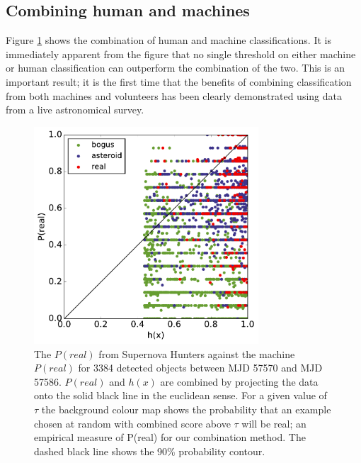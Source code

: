 \documentclass[a4paper,fleqn,usenatbib]{mnras}
\begin{document}
\subsection{Combining human and machines} 

Figure \ref{fig:combo_train} shows the combination of human and machine classifications. It is immediately apparent from the figure that no single threshold on either machine or human classification can outperform the combination of the two. This is an important result; it is the first time that the benefits of combining classification from both machines and volunteers has been clearly demonstrated using data from a live astronomical survey. 

\begin{figure}
   \includegraphics[width=84mm]{figs/human_v_machine_20160712-20160718_1.pdf}
   \caption{The $P(real)$ from Supernova Hunters against the machine $P(real)$ for 3384 detected 
            objects between MJD 57570 and MJD 57586.  $P(real)$ and $h(x)$ are combined by projecting the data onto 
             the solid black line in the euclidean sense.  For a given value of $\tau$ the background colour map
            shows the probability that an example chosen at random with combined score above $\tau$ will be real; an
            empirical measure of P(real) for our combination method.  The dashed black line shows the 90\% probability contour.}
   \label{fig:combo_train} 
\end{figure}

\end{document}

